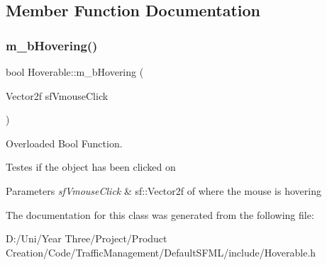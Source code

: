 \subsection{Member Function Documentation}
\hypertarget{class_hoverable_a5b2698e36a45fc22a0a45c74608213c5}{}\label{class_hoverable_a5b2698e36a45fc22a0a45c74608213c5} 
\subsubsection{\texorpdfstring{m\+\_\+b\+Hovering()}{m\_bHovering()}}
{\footnotesize\ttfamily bool Hoverable\+::m\+\_\+b\+Hovering (\begin{DoxyParamCaption}\item[{Vector2f}]{sf\+Vmouse\+Click }\end{DoxyParamCaption})}



Overloaded Bool Function. 

Testes if the object has been clicked on


\begin{DoxyParams}{Parameters}
{\em sf\+Vmouse\+Click} & sf\+::\+Vector2f of where the mouse is hovering \\
\hline
\end{DoxyParams}


The documentation for this class was generated from the following file\+:\begin{DoxyCompactItemize}
\item 
D\+:/\+Uni/\+Year Three/\+Project/\+Product Creation/\+Code/\+Traffic\+Management/\+Default\+S\+F\+M\+L/include/Hoverable.\+h\end{DoxyCompactItemize}
